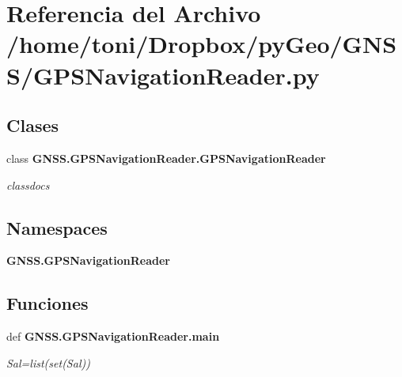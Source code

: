 \section{Referencia del Archivo /home/toni/\-Dropbox/py\-Geo/\-G\-N\-S\-S/\-G\-P\-S\-Navigation\-Reader.py}
\label{GPSNavigationReader_8py}
\subsection*{Clases}
\begin{DoxyCompactItemize}
\item 
class {\bf G\-N\-S\-S.\-G\-P\-S\-Navigation\-Reader.\-G\-P\-S\-Navigation\-Reader}
\begin{DoxyCompactList}\small\item\em classdocs \end{DoxyCompactList}\end{DoxyCompactItemize}
\subsection*{Namespaces}
\begin{DoxyCompactItemize}
\item 
{\bf G\-N\-S\-S.\-G\-P\-S\-Navigation\-Reader}
\end{DoxyCompactItemize}
\subsection*{Funciones}
\begin{DoxyCompactItemize}
\item 
def {\bf G\-N\-S\-S.\-G\-P\-S\-Navigation\-Reader.\-main}
\begin{DoxyCompactList}\small\item\em Sal=list(set(\-Sal)) \end{DoxyCompactList}\end{DoxyCompactItemize}
